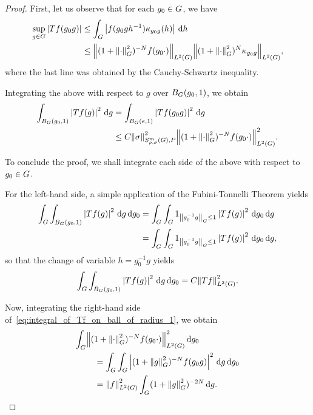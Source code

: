 \begin{proof}
    First, let us observe that for each $g_0 \in \Group$, we have
    \begin{align*}
        \sup_{g \in \Group} \abs {T f(g_0 g)}
        &\leq \int_\Group \abs{f(g_0 g h^{-1}) \kappa_{g_0 g}(h)} \dd h\\
        &\leq \norm [\Lebesgue 2 \Group] {(1 + \norm [\Group] \dummy^2)^{-N} f(g_0 \dummy)} \norm [\Lebesgue 2 \Group] {(1 + \norm [\Group] \dummy^2)^N \kappa_{g_0 g}},
    \end{align*}
    where the last line was obtained by the Cauchy-Schwartz inequality.

    Integrating the above with respect to $g$ over $\Ball [\Group] {g_0} 1$,
    we obtain
    \begin{align}
        \int_{\Ball [\Group] {g_0} 1} \abs {T f(g)}^2 \dd g
        &= \int_{\Ball [\Group] e 1} \abs {T f(g_0 g)}^2 \dd g\notag\\
        &\leq C \SymbolSemiNorm m {\rho, \sigma} P \sigma^2
        \norm [\Lebesgue 2 \Group] {(1 + \norm [\Group] \dummy^2)^{-N} f(g_0 \dummy)}^2.
        \label{eq:integral_of_Tf_on_ball_of_radius_1}
    \end{align}

    To conclude the proof,
    we shall integrate each side of the above with respect to $g_0 \in \Group$.

    For the left-hand side,
    a simple application of the Fubini-Tonnelli Theorem yields
    \begin{align*}
        \int_\Group \int_{\Ball [\Group] {g_0} 1} \abs {T f(g)}^2 \dd g \dd g_0
        &= \int_\Group \int_\Group 1_{\norm [\Group] {g_0^{-1} g} \leq 1} \abs {T f(g)}^2 \dd g_0 \dd g\\
        &= \int_\Group \int_\Group 1_{\norm [\Group] {g_0^{-1} g} \leq 1} \abs {T f(g)}^2 \dd g_0 \dd g,
    \end{align*}
    so that the change of variable $h = g_0^{-1} g$ yields
    \begin{align}
        \int_\Group \int_{\Ball [\Group] {g_0} 1} \abs {T f(g)}^2 \dd g \dd g_0
        = C \norm [\Lebesgue 2 \Group] {T f}^2.
        \label{eq:left_hand_side_of_ball_integral_for_L2_boundedness}
    \end{align}

    Now, integrating the right-hand side of~\eqref{eq:integral_of_Tf_on_ball_of_radius_1},
    we obtain
    \begin{align*}
        \int_\Group &\norm [\Lebesgue 2 \Group] {(1 + \norm [\Group] \dummy^2)^{-N} f(g_0 \dummy)}^2 \dd g_0\\
        &\quad = \int_\Group \int_\Group \abs{(1 + \norm [\Group] g^2)^{-N} f(g_0 g)}^2 \dd g \dd g_0\\
        &\quad = \norm [\Lebesgue 2 \Group] f^2 \int_\Group (1 + \norm [\Group] g^2)^{-2 N} \dd g.
    \end{align*}


\end{proof}
